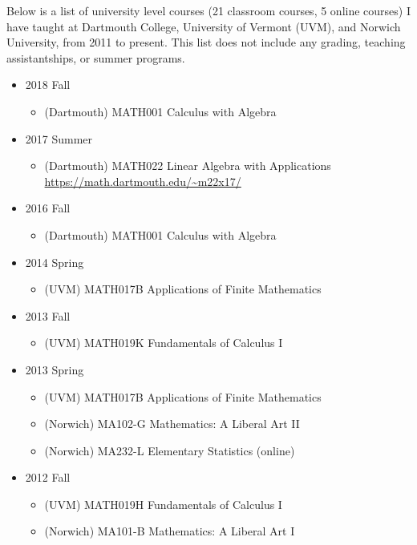 \documentclass[a4paper]{adcv}
\begin{document}
Below is a list of university level courses
(21 classroom courses, 5 online courses)
I have taught at
Dartmouth College,
University of Vermont (UVM),
and
Norwich University,
from 2011 to present.
This list does not include any grading, teaching assistantships,
or summer programs.
\begin{itemize}
  \item
    2018 Fall
    \begin{itemize}
      \item
        (Dartmouth) MATH001 Calculus with Algebra
    \end{itemize}
  \item
    2017 Summer
    \begin{itemize}
      \item
        (Dartmouth) MATH022 Linear Algebra with Applications
        \newline
        \url{https://math.dartmouth.edu/~m22x17/}
    \end{itemize}
  \item
    2016 Fall
    \begin{itemize}
      \item
        (Dartmouth) MATH001 Calculus with Algebra
    \end{itemize}
  \item
    2014 Spring
    \begin{itemize}
      \item (UVM) MATH017B Applications of Finite Mathematics
    \end{itemize}
  \item
    2013 Fall
    \begin{itemize}
      \item (UVM) MATH019K Fundamentals of Calculus I
    \end{itemize}
  \item
    2013 Spring
    \begin{itemize}
      \item (UVM) MATH017B Applications of Finite Mathematics
      \item (Norwich) MA102-G Mathematics: A Liberal Art II
      \item (Norwich) MA232-L Elementary Statistics (online)
    \end{itemize}
  \item
    2012 Fall
    \begin{itemize}
      \item (UVM) MATH019H Fundamentals of Calculus I
      \item (Norwich) MA101-B Mathematics: A Liberal Art I

\end{itemize}
\end{itemize}
\end{document}
